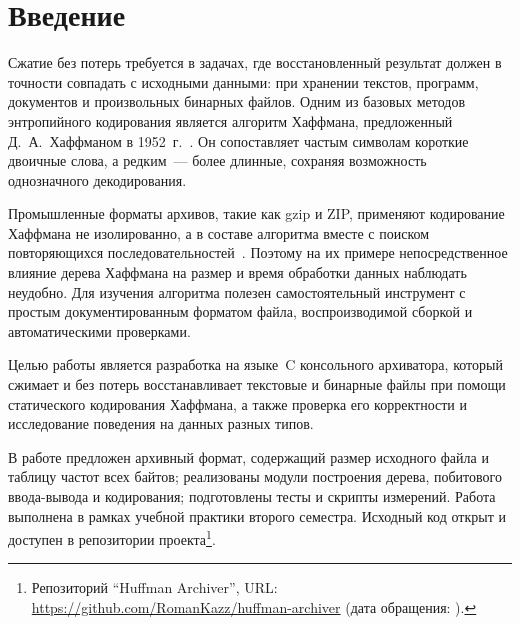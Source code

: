 
\section*{Введение}
\thispagestyle{withCompileDate}

Сжатие без потерь требуется в задачах, где восстановленный результат должен
в точности совпадать с исходными данными: при хранении текстов, программ,
документов и произвольных бинарных файлов. Одним из базовых методов
энтропийного кодирования является алгоритм Хаффмана, предложенный
Д.~А.~Хаффманом в 1952~г.~\cite{huffman1952}. Он сопоставляет частым символам
короткие двоичные слова, а редким~--- более длинные, сохраняя возможность
однозначного декодирования.

Промышленные форматы архивов, такие как gzip и ZIP, применяют кодирование
Хаффмана не изолированно, а в составе алгоритма \Deflate{} вместе с поиском
повторяющихся последовательностей~\cite{rfc1951,zlib}. Поэтому на их примере
непосредственное влияние дерева Хаффмана на размер и время обработки данных
наблюдать неудобно. Для изучения алгоритма полезен самостоятельный инструмент
с простым документированным форматом файла, воспроизводимой сборкой и
автоматическими проверками.

Целью работы является разработка на языке~C консольного архиватора, который
сжимает и без потерь восстанавливает текстовые и бинарные файлы при помощи
статического кодирования Хаффмана, а также проверка его корректности и
исследование поведения на данных разных типов.

В работе предложен архивный формат, содержащий размер исходного файла и таблицу
частот всех байтов; реализованы модули построения дерева, побитового
ввода-вывода и кодирования; подготовлены тесты и скрипты измерений. Работа
выполнена в рамках учебной практики второго семестра. Исходный код открыт и
доступен в репозитории проекта\footnote{Репозиторий \enquote{Huffman Archiver}, URL:
\url{https://github.com/RomanKazz/huffman-archiver} (дата обращения:
).}.
